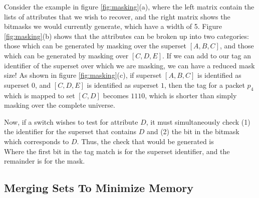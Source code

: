 Consider the example in figure \ref{fig:masking}(a), where the left matrix
contain the lists of attributes that we wish to recover, and the right matrix
shows the bitmasks we would currently generate, which have a width of 5. Figure
\ref{fig:masking}(b) shows that the attributes can be broken up into two
categories: those which can be generated by masking over the superset $[A,B,C]$,
and those which can be generated by masking over $[C,D,E]$. If we can add to our
tag an identifier of the superset over which we are masking, we can have a
reduced mask size! As shown in figure \ref{fig:masking}(c), if superset
$[A,B,C]$ is identified as superset $0$, and $[C,D,E]$ is identified as superset
$1$, then the tag for a packet $p_4$ which is mapped to set $[C,D]$ becomes
$1110$, which is shorter than simply masking over the complete universe.

Now, if a switch wishes to test for attribute $D$, it must simultaneously check
(1) the identifier for the superset that contains $D$ and (2) the bit in the
bitmask which corresponds to $D$. Thus, the check that would be generated is\\
Where the first bit in the tag match is for
the superset identifier, and the remainder is for the mask.



\subsection{Merging Sets To Minimize Memory}
\label{ssec:merge}




